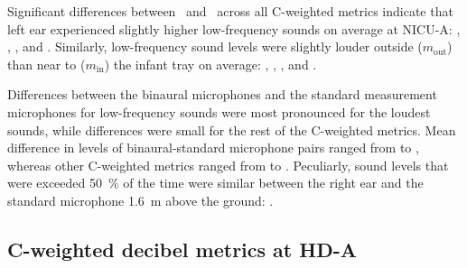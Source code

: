 

Significant differences between \binL\ and \binR\ across all C-weighted metrics indicate that left ear experienced slightly higher low-frequency sounds on average at NICU-A: , , , and  \dbc{}. Similarly, low-frequency sound levels were slightly louder outside ($m_\text{out}$) than near to ($m_\text{in}$) the infant tray on average:  , , , and  \dbc{}. 





Differences between the binaural microphones and the standard measurement microphones for low-frequency sounds were most pronounced for the loudest sounds, while differences were small for the rest of the C-weighted metrics. Mean difference in  levels of binaural-standard microphone pairs ranged from  to  \dbc{}, whereas other C-weighted metrics ranged from  to  \dbc{}. Peculiarly, sound levels that were exceeded \SI{50}{\percent} of the time were similar between the right ear and the standard microphone \SI{1.6}{\meter} above the ground:  \dbc{}. 

\subsection{C-weighted decibel metrics at HD-A}

